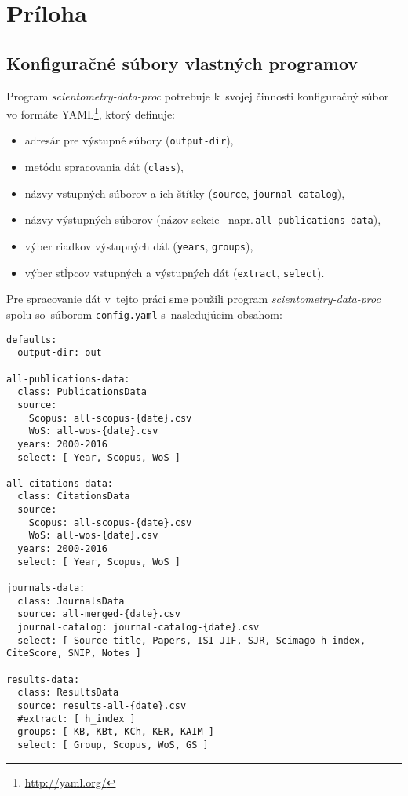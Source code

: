 \chapter*{Príloha}

\section*{Konfiguračné súbory vlastných programov}

Program \emph{scientometry-data-proc} potrebuje k~svojej činnosti konfiguračný
súbor vo formáte YAML\footnote{\url{http://yaml.org/}}, ktorý definuje:
\begin{itemize}
  \item adresár pre výstupné súbory (\verb|output-dir|),
  \item metódu spracovania dát (\verb|class|),
  \item názvy vstupných súborov a ich štítky (\verb|source|, \verb|journal-catalog|),
  \item názvy výstupných súborov (názov sekcie\,--\,napr.\,\verb|all-publications-data|),
  \item výber riadkov výstupných dát (\verb|years|, \verb|groups|),
  \item výber stĺpcov vstupných a výstupných dát (\verb|extract|, \verb|select|).
\end{itemize}
Pre spracovanie dát v~tejto práci sme použili program
\emph{scientometry-data-proc} spolu so~súborom \verb|config.yaml|
s~nasledujúcim obsahom:

\begin{source}
\begin{verbatim}
defaults:
  output-dir: out

all-publications-data:
  class: PublicationsData
  source:
    Scopus: all-scopus-{date}.csv
    WoS: all-wos-{date}.csv
  years: 2000-2016
  select: [ Year, Scopus, WoS ]

all-citations-data:
  class: CitationsData
  source:
    Scopus: all-scopus-{date}.csv
    WoS: all-wos-{date}.csv
  years: 2000-2016
  select: [ Year, Scopus, WoS ]

journals-data:
  class: JournalsData
  source: all-merged-{date}.csv
  journal-catalog: journal-catalog-{date}.csv
  select: [ Source title, Papers, ISI JIF, SJR, Scimago h-index, CiteScore, SNIP, Notes ]

results-data:
  class: ResultsData
  source: results-all-{date}.csv
  #extract: [ h_index ]
  groups: [ KB, KBt, KCh, KER, KAIM ]
  select: [ Group, Scopus, WoS, GS ]
\end{verbatim}
\end{source}

